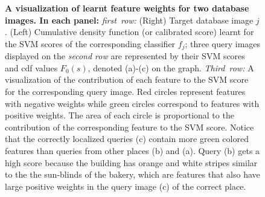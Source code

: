 \begin{figure}
    \caption{
      {\bf  A visualization of learnt feature weights for two database images. In each panel:} 
      \emph{first~row:} 
      (Right) Target database image $j$. 
      (Left) Cumulative density function (or calibrated score) learnt for the SVM scores of the corresponding classifier $f_j$;  three query images displayed on the 
      \emph{second row} are represented by their SVM scores and cdf values $F_0(s)$, denoted (a)-(c) on the graph. 
      \emph{Third~row:} A visualization of the contribution of each feature to the SVM score for the corresponding query image. Red circles represent features with negative weights while green circles correspond to features with positive weights. The area of each circle is proportional to the contribution of the corresponding feature to the SVM score.
      Notice that the correctly localized queries (c) contain more green colored features than queries from other places (b) and (a). Query (b) gets a high score because the building has orange and white stripes similar to the the sun-blinds of the bakery, which are features that also have large positive weights in the query image (c) of the correct place.
    }
    \label{fig:3qVSw}
        \vspace*{2mm}
    \end{figure}
